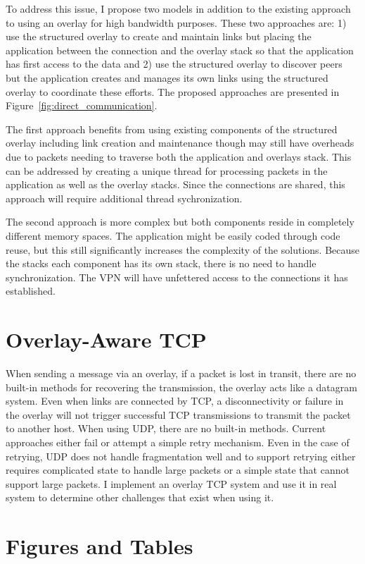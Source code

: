 To address this issue, I propose two models in addition to the existing
approach to using an overlay for high bandwidth purposes.  These two
approaches are:  1) use the structured overlay to create and maintain
links but placing the application between the connection and the overlay
stack so that the application has first access to the data and 2) use
the structured overlay to discover peers but the application creates and
manages its own links using the structured overlay to coordinate these
efforts.  The proposed approaches are presented in
Figure~\ref{fig:direct_communication}.

The first approach benefits from using existing components of the structured
overlay including link creation and maintenance though may still have overheads
due to packets needing to traverse both the application and overlays stack.
This can be addressed by creating a unique thread for processing packets in the
application as well as the overlay stacks.  Since the connections are shared,
this approach will require additional thread sychronization.

The second approach is more complex but both components reside in completely
different memory spaces.  The application might be easily coded through code
reuse, but this still significantly increases the complexity of the solutions.
Because the stacks each component has its own stack, there is no need to
handle synchronization.  The VPN will have unfettered access to the connections
it has established.

\section{Overlay-Aware TCP}
When sending a message via an overlay, if a packet is lost in transit, there
are no built-in methods for recovering the transmission, the overlay acts like
a datagram system.  Even when links are connected by TCP, a disconnectivity
or failure in the overlay will not trigger successful TCP transmissions to
transmit the packet to another host.  When using UDP, there are no built-in
methods.  Current approaches either fail or attempt a simple retry mechanism.
Even in the case of retrying, UDP does not handle fragmentation well and to
support retrying either requires complicated state to handle large packets
or a simple state that cannot support large packets.  I implement an overlay
TCP system and use it in real system to determine other challenges that exist
when using it.

\section{Figures and Tables}

